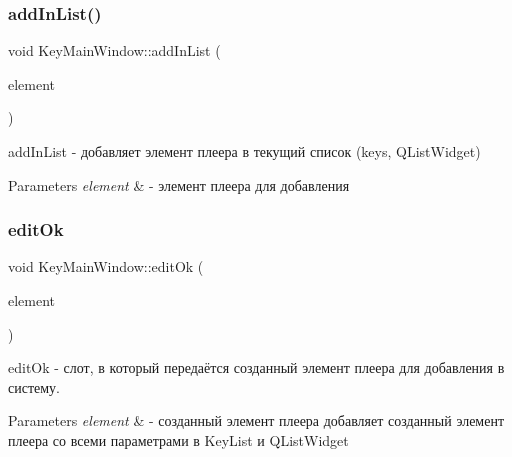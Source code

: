 \subsubsection{\texorpdfstring{add\+In\+List()}{addInList()}}
{\footnotesize\ttfamily void Key\+Main\+Window\+::add\+In\+List (\begin{DoxyParamCaption}\item[{\hyperlink{class_key_element}{Key\+Element} $\ast$}]{element }\end{DoxyParamCaption})}



add\+In\+List -\/ добавляет элемент плеера в текущий список (keys, Q\+List\+Widget) 


\begin{DoxyParams}{Parameters}
{\em element} & -\/ элемент плеера для добавления \\
\hline
\end{DoxyParams}
\mbox{\label{class_key_main_window_aaf05ff47462e7e4e396edc946a64fd7d}} 
\subsubsection{\texorpdfstring{edit\+Ok}{editOk}}
{\footnotesize\ttfamily void Key\+Main\+Window\+::edit\+Ok (\begin{DoxyParamCaption}\item[{\hyperlink{class_key_element}{Key\+Element} $\ast$}]{element }\end{DoxyParamCaption})\hspace{0.3cm}{\ttfamily [slot]}}



edit\+Ok -\/ слот, в который передаётся созданный элемент плеера для добавления в систему. 


\begin{DoxyParams}{Parameters}
{\em element} & -\/ созданный элемент плеера добавляет созданный элемент плеера со всеми параметрами в Key\+List и Q\+List\+Widget \\
\hline
\end{DoxyParams}
\mbox{\label{class_key_main_window_a13f36481d6b0d1f68dceca8a1c1ec2c1}} 
